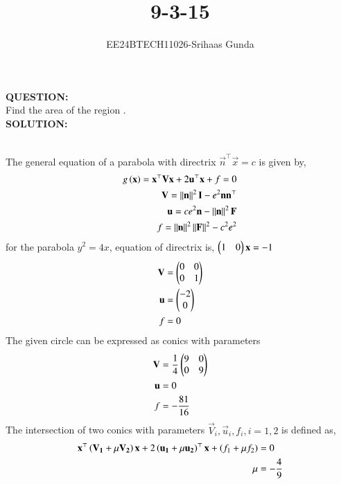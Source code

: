 \documentclass[journal]{IEEEtran}
\numberwithin{equation}{enumi}
\numberwithin{figure}{enumi}
\begin{document}


\title{9-3-15}
\author{EE24BTECH11026-Srihaas Gunda}

{\let\newpage\relax\maketitle}

\textbf{QUESTION:} \\
	Find the area of the region .\\
\textbf{SOLUTION:} \\
\begin{table}[h!]    
	\centering
	
\end{table}\\
The general equation of a parabola with directrix $\vec{n}^{\top}\vec{x}=c$ is given by,
\begin{align*}
g\left(\mathbf{x}\right)=\mathbf{x}^{\top}\mathbf{V}\mathbf{x}+2\mathbf{u}^{\top}\mathbf{x}+f=0\\
\mathbf{V}=\left\lVert\mathbf{n}\right\rVert^2\mathbf{I}-e^2\mathbf{n}\mathbf{n}^{\top}\\
\mathbf{u}=ce^2\mathbf{n}-\left\lVert\mathbf{n}\right\rVert^2\mathbf{F}\\
f=\left\lVert\mathbf{n}\right\rVert^2\left\lVert\mathbf{F}\right\rVert^2-c^2e^2
\end{align*}
for the parabola $y^2=4x$, equation of directrix is, $\begin{pmatrix}1&0\end{pmatrix}\mathbf{x}=-1$
\begin{align*}
\mathbf{V}&=\begin{pmatrix}0&0\\0&1\end{pmatrix}\\
\mathbf{u}&=\begin{pmatrix}-2\\0\end{pmatrix}\\
f&=0
\end{align*}
The given circle can be expressed as conics with parameters
\begin{align*}
\mathbf{V}&=\frac{1}{4}\begin{pmatrix}9 & 0\\0 & 9\end{pmatrix}\\
\mathbf{u}&=0\\
f&=-\frac{81}{16}
\end{align*}
The intersection of two conics with parameters $\vec{V}_i,\vec{u}_i,f_i, i=1,2$ is defined as,
\begin{align*}
\mathbf{x}^{\top}\left(\mathbf{V_1}+\mu\mathbf{V_2}\right)\mathbf{x}+2\left(\mathbf{u_1}+\mu\mathbf{u_2}\right)^{\top}\mathbf{x}+\left(f_1+\mu f_2\right)&=0\\
\mu&=-\frac{4}{9}\\
\end{align*} 
\end{document}
